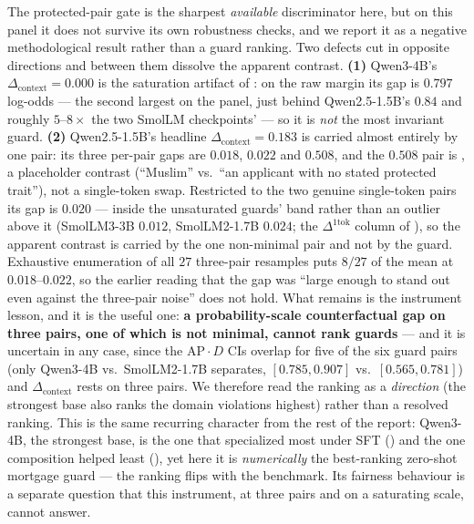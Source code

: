The protected-pair gate is the sharpest \emph{available} discriminator here, but on this panel it does
not survive its own robustness checks, and we report it as a negative methodological result rather than a
guard ranking. Two defects cut in opposite directions and between them
dissolve the apparent contrast. \textbf{(1)} Qwen3-4B's
$\Delta_{\mathrm{context}} = 0.000$ is the saturation artifact of : on the
raw margin its gap is $0.797$ log-odds --- the second largest on the panel, just behind
Qwen2.5-1.5B's $0.84$ and roughly $5$--$8\times$ the two SmolLM checkpoints' --- so it is
\emph{not} the most invariant guard. \textbf{(2)} Qwen2.5-1.5B's headline
$\Delta_{\mathrm{context}} = 0.183$ is carried almost entirely by one pair: its three per-pair gaps are
$0.018$, $0.022$ and $0.508$, and the $0.508$ pair is , a placeholder contrast
(``Muslim'' vs.\ ``an applicant with no stated protected trait''), not a single-token swap. Restricted to
the two genuine single-token pairs its gap is $0.020$ --- inside the unsaturated guards' band rather than
an outlier above it (SmolLM3-3B $0.012$, SmolLM2-1.7B $0.024$; the $\Delta^{\mathrm{1tok}}$ column of
), so the apparent contrast is carried by the one non-minimal pair and not by the
guard. Exhaustive enumeration of all $27$ three-pair
resamples puts $8/27$ of the mean at $0.018$--$0.022$, so the earlier reading that the gap was ``large
enough to stand out even against the three-pair noise'' does not hold. What remains is the instrument
lesson, and it is the useful one: \textbf{a probability-scale counterfactual gap on three pairs, one of
which is not minimal, cannot rank guards} --- and it is uncertain in any case, since the
$\text{AP}\cdot D$ CIs overlap for five of the six guard pairs (only Qwen3-4B vs.\ SmolLM2-1.7B
separates, $[0.785,0.907]$ vs.\ $[0.565,0.781]$) and $\Delta_{\mathrm{context}}$ rests on three pairs. We
therefore read the ranking as a \emph{direction} (the
strongest base also ranks the domain violations highest) rather than a resolved ranking.
This is the same recurring character from the rest of the report:
Qwen3-4B, the strongest base, is the one that specialized most under SFT () and the one
composition helped least (), yet here it is \emph{numerically} the best-ranking
zero-shot mortgage guard --- the ranking flips with the benchmark. Its fairness behaviour is a separate
question that this instrument, at three pairs and on a saturating scale, cannot answer.

